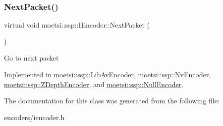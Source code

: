 \mbox{\label{classmoetsi_1_1ssp_1_1IEncoder_afac3ddcf2f49be16020c83cb9e0fb274}} 
\subsubsection{\texorpdfstring{Next\+Packet()}{NextPacket()}\hspace{0.1cm}{\footnotesize\ttfamily [2/2]}}
{\footnotesize\ttfamily virtual void moetsi\+::ssp\+::\+I\+Encoder\+::\+Next\+Packet (\begin{DoxyParamCaption}{ }\end{DoxyParamCaption})\hspace{0.3cm}{\ttfamily [pure virtual]}}

Go to next packet 

Implemented in \hyperlink{classmoetsi_1_1ssp_1_1LibAvEncoder_acf5e6e2f172d24778c7942c8cd37330b}{moetsi\+::ssp\+::\+Lib\+Av\+Encoder}, \hyperlink{classmoetsi_1_1ssp_1_1NvEncoder_a1c6d801fbb40e7dea2b33dd2ac154919}{moetsi\+::ssp\+::\+Nv\+Encoder}, \hyperlink{classmoetsi_1_1ssp_1_1ZDepthEncoder_ae3911f396fc8b86c04c94dc71e1c0672}{moetsi\+::ssp\+::\+Z\+Depth\+Encoder}, and \hyperlink{classmoetsi_1_1ssp_1_1NullEncoder_a5fe7215f2b462690208b2a144e962e14}{moetsi\+::ssp\+::\+Null\+Encoder}.



The documentation for this class was generated from the following file\+:\begin{DoxyCompactItemize}
\item 
encoders/iencoder.\+h\end{DoxyCompactItemize}
